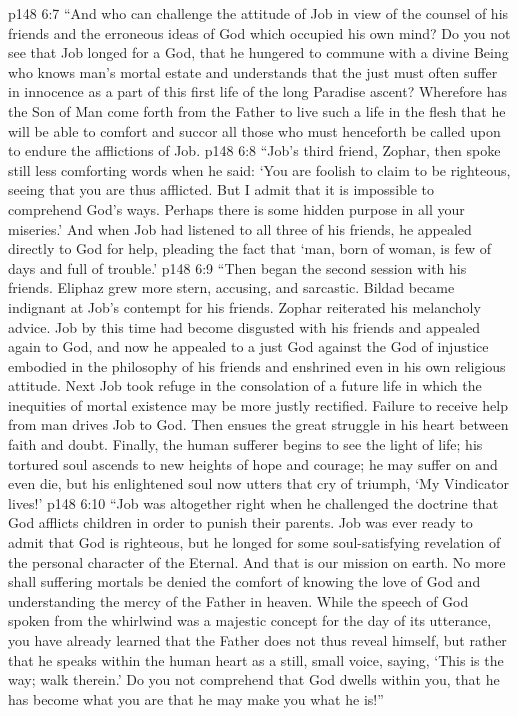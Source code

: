 \vs p148 6:7 \textcolor{ubdarkred}{“And who can challenge the attitude of Job in view of the counsel of his friends and the erroneous ideas of God which occupied his own mind? Do you not see that Job longed for a  God, that he hungered to commune with a divine Being who knows man’s mortal estate and understands that the just must often suffer in innocence as a part of this first life of the long Paradise ascent? Wherefore has the Son of Man come forth from the Father to live such a life in the flesh that he will be able to comfort and succor all those who must henceforth be called upon to endure the afflictions of Job.}
\vs p148 6:8 \textcolor{ubdarkred}{“Job’s third friend, Zophar, then spoke still less comforting words when he said: ‘You are foolish to claim to be righteous, seeing that you are thus afflicted. But I admit that it is impossible to comprehend God’s ways. Perhaps there is some hidden purpose in all your miseries.’ And when Job had listened to all three of his friends, he appealed directly to God for help, pleading the fact that ‘man, born of woman, is few of days and full of trouble.’}
\vs p148 6:9 \textcolor{ubdarkred}{“Then began the second session with his friends. Eliphaz grew more stern, accusing, and sarcastic. Bildad became indignant at Job’s contempt for his friends. Zophar reiterated his melancholy advice. Job by this time had become disgusted with his friends and appealed again to God, and now he appealed to a just God against the God of injustice embodied in the philosophy of his friends and enshrined even in his own religious attitude. Next Job took refuge in the consolation of a future life in which the inequities of mortal existence may be more justly rectified. Failure to receive help from man drives Job to God. Then ensues the great struggle in his heart between faith and doubt. Finally, the human sufferer begins to see the light of life; his tortured soul ascends to new heights of hope and courage; he may suffer on and even die, but his enlightened soul now utters that cry of triumph, ‘My Vindicator lives!’}
\vs p148 6:10 \textcolor{ubdarkred}{“Job was altogether right when he challenged the doctrine that God afflicts children in order to punish their parents. Job was ever ready to admit that God is righteous, but he longed for some soul\hyp{}satisfying revelation of the personal character of the Eternal. And that is our mission on earth. No more shall suffering mortals be denied the comfort of knowing the love of God and understanding the mercy of the Father in heaven. While the speech of God spoken from the whirlwind was a majestic concept for the day of its utterance, you have already learned that the Father does not thus reveal himself, but rather that he speaks within the human heart as a still, small voice, saying, ‘This is the way; walk therein.’ Do you not comprehend that God dwells within you, that he has become what you are that he may make you what he is!”}
